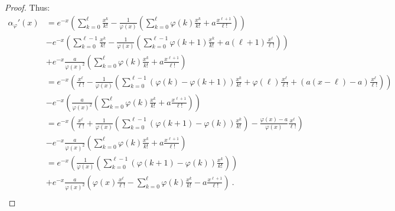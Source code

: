 \begin{proof}
  Thus:
  \begin{equation}
    \begin{aligned}
    \alpha_{\varphi}'(x) &= e^{-x}\left(\sum_{k=0}^{\ell} \frac{x^k}{k!} - \frac{1}{\varphi(x)}\left(\sum_{k=0}^{\ell} \varphi(k)\frac{x^k}{k!} + a\frac{x^{\ell+1}}{\ell!}\right) \right)\\
    &- e^{-x}\left(\sum_{k=0}^{\ell-1} \frac{x^k}{k!}  - \frac{1}{\varphi(x)}\left(\sum_{k=0}^{\ell-1} \varphi(k+1)\frac{x^k}{k!} + a(\ell+1)\frac{x^{\ell}}{\ell!}\right)\right)\\
    &+ e^{-x}\frac{a}{\varphi(x)^2}\left(\sum_{k=0}^{\ell} \varphi(k)\frac{x^k}{k!} + a\frac{x^{\ell+1}}{\ell!}\right)\\
    &= e^{-x}\left(\frac{x^{\ell}}{\ell!} - \frac{1}{\varphi(x)}\left(\sum_{k=0}^{\ell-1}(\varphi(k)- \varphi(k+1))\frac{x^k}{k!} + \varphi(\ell)\frac{x^{\ell}}{\ell!} +  (a(x-\ell)-a)\frac{x^{\ell}}{\ell!}\right)\right)\\
    &- e^{-x}\left(\frac{a}{\varphi(x)^2}\left(\sum_{k=0}^{\ell} \varphi(k)\frac{x^k}{k!} + a\frac{x^{\ell+1}}{\ell!}\right)\right)\\
    &= e^{-x}\left(\frac{x^{\ell}}{\ell!} + \frac{1}{\varphi(x)}\left(\sum_{k=0}^{\ell-1}(\varphi(k+1)- \varphi(k))\frac{x^k}{k!}\right) - \frac{\varphi(x)-a}{\varphi(x)}\frac{x^{\ell}}{\ell!}\right)\\
    &-  e^{-x}\frac{a}{\varphi(x)^2}\left(\sum_{k=0}^{\ell} \varphi(k)\frac{x^k}{k!} + a\frac{x^{\ell+1}}{\ell!}\right)\\
    &= e^{-x}\left(\frac{1}{\varphi(x)}\left(\sum_{k=0}^{\ell-1}(\varphi(k+1)- \varphi(k))\frac{x^k}{k!}\right)\right)\\
    &+  e^{-x}\frac{a}{\varphi(x)^2}\left(\varphi(x)\frac{x^{\ell}}{\ell!} - \sum_{k=0}^{\ell} \varphi(k)\frac{x^k}{k!} - a\frac{x^{\ell+1}}{\ell!}\right) \ .\\
    \end{aligned}
  \end{equation}
  

\end{proof}
